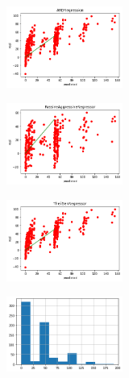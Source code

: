 \begin{figure}
            
    \medskip  %
            
           \begin{subfigure}[t]{1.5in}
            \centering
                \includegraphics[width=1.5in]{output_60_8.png}  
                \caption{}
        \end{subfigure}
        \begin{subfigure}[t]{1.5in}
            \centering
            \includegraphics[width=1.5in]{output_60_10.png} 
            \caption{}
        \end{subfigure}
        \begin{subfigure}[t]{1.5in}
            \centering
            \includegraphics[width=1.5in]{output_60_12.png}
            \caption{}
        \end{subfigure}
            \begin{subfigure}[t]{1.5in}
            \centering
            \includegraphics[width=1.5in]{output_61_1.png}
            \caption{}\label{fig:ml:classier_hist} 
        \end{subfigure}
        
        \medskip  %
            

\end{figure}
